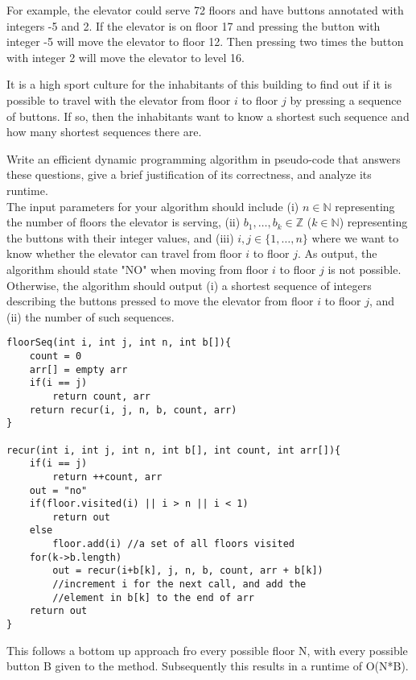 \documentclass[11pt]{amsart}
\begin{document}
For example, the elevator could serve 72 floors and have buttons annotated with integers -5 and 2. If the elevator is on
floor 17 and pressing the button with integer -5 will move the elevator to floor 12. Then pressing two times the button with
integer 2 will move the elevator to level 16.\medskip

It is a high sport culture for the inhabitants of this building to find out if it is possible to travel with the elevator from floor
$i$ to floor $j$ by pressing a sequence of buttons. If so, then the inhabitants want to know a shortest such sequence
and how many shortest sequences there are.\medskip

Write an efficient dynamic programming algorithm in pseudo-code that answers these questions, give a brief justification
of its correctness, and analyze its runtime.\\

The input parameters for your algorithm should include (i) $n\in \mathbb{N}$ representing the number of floors the 
elevator is serving, (ii) $b_1,\ldots, b_k \in \mathbb{Z}$ ($k\in\mathbb{N}$) representing the buttons with their
integer values, and (iii) $i,j \in \{1,\ldots , n\}$ where we want to know whether the elevator can travel from floor $i$ to floor $j$.
As output, the algorithm should state "NO" when moving from floor $i$ to floor $j$ is not possible. Otherwise, the 
algorithm should output (i) a shortest sequence of integers describing the buttons pressed to move the elevator from floor
$i$ to floor $j$, and (ii) the number of such sequences.

\newpage
\begin{lstlisting}
floorSeq(int i, int j, int n, int b[]){
    count = 0
    arr[] = empty arr
    if(i == j) 
        return count, arr
    return recur(i, j, n, b, count, arr)
}

recur(int i, int j, int n, int b[], int count, int arr[]){
    if(i == j) 
        return ++count, arr
    out = "no"
    if(floor.visited(i) || i > n || i < 1) 
        return out
    else 
        floor.add(i) //a set of all floors visited
    for(k->b.length)
        out = recur(i+b[k], j, n, b, count, arr + b[k]) 
        //increment i for the next call, and add the 
        //element in b[k] to the end of arr
    return out    
}
\end{lstlisting}
This follows a bottom up approach fro every possible floor N, with every possible button B given to the method. Subsequently this results in a runtime of O(N*B).
\newpage
\end{document}
